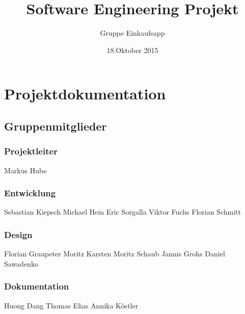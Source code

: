 \documentclass[12pt,a4paper]{article}
\begin{document}
\title{Software Engineering Projekt}
\author{Gruppe Einkaufsapp}
\date {18.Oktober 2015}
\maketitle
\newpage
\tableofcontents
\newpage
\section*{Projektdokumentation}
\subsection*{Gruppenmitglieder}
\subsubsection*{Projektleiter}
Markus Hube
\subsubsection*{Entwicklung}
Sebastian Kiepsch
\newline
Michael Hein
\newline
Eric Sorgalla
\newline
Viktor Fuchs
\newline
Florian Schmitt 
\subsubsection*{Design}
Florian Graupeter
\newline
Moritz Karsten
\newline
Moritz Schaub
\newline
Jannis Grohs
\newline
Daniel Sawadenko 
\subsubsection*{Dokumentation}
Huong Dang
\newline
Thomas Elias
\newline
Annika Köstler
\newpage

\end{document}
